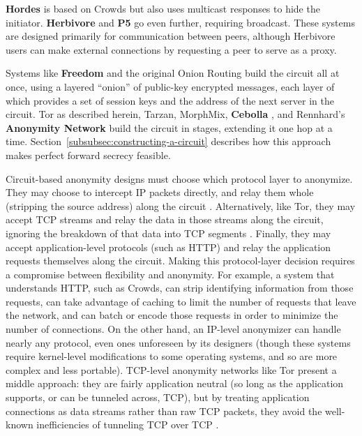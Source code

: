 \documentclass[times,10pt,twocolumn]{article}
\begin{document}
{\bf Hordes} \cite{hordes-jcs} is based on Crowds but also uses multicast
responses to hide the initiator. {\bf Herbivore} \cite{herbivore} and
{\bf P5} \cite{p5} go even further, requiring broadcast.
These systems are designed primarily for communication between peers,
although Herbivore users can make external connections by
requesting a peer to serve as a proxy.

Systems like {\bf Freedom} and the original Onion Routing build the circuit
all at once, using a layered ``onion'' of public-key encrypted messages,
each layer of which provides a set of session keys and the address of the
next server in the circuit. Tor as described herein, Tarzan, MorphMix,
{\bf Cebolla} \cite{cebolla}, and Rennhard's {\bf Anonymity Network} \cite{anonnet}
build the circuit
in stages, extending it one hop at a time.
Section~\ref{subsubsec:constructing-a-circuit} describes how this
approach makes perfect forward secrecy feasible.

Circuit-based anonymity designs must choose which protocol layer
to anonymize. They may choose to intercept IP packets directly, and
relay them whole (stripping the source address) along the circuit
\cite{freedom2-arch,tarzan:ccs02}.  Alternatively, like
Tor, they may accept TCP streams and relay the data in those streams
along the circuit, ignoring the breakdown of that data into TCP segments
\cite{morphmix:fc04,anonnet}. Finally, they may accept application-level
protocols (such as HTTP) and relay the application requests themselves
along the circuit.  
Making this protocol-layer decision requires a compromise between flexibility
and anonymity.  For example, a system that understands HTTP, such as Crowds,
can strip
identifying information from those requests, can take advantage of caching
to limit the number of requests that leave the network, and can batch
or encode those requests in order to minimize the number of connections.
On the other hand, an IP-level anonymizer can handle nearly any protocol,
even ones unforeseen by its designers (though these systems require
kernel-level modifications to some operating systems, and so are more
complex and less portable). TCP-level anonymity networks like Tor present
a middle approach: they are fairly application neutral (so long as the
application supports, or can be tunneled across, TCP), but by treating
application connections as data streams rather than raw TCP packets,
they avoid the well-known inefficiencies of tunneling TCP over TCP
\cite{tcp-over-tcp-is-bad}.
\end{document}
